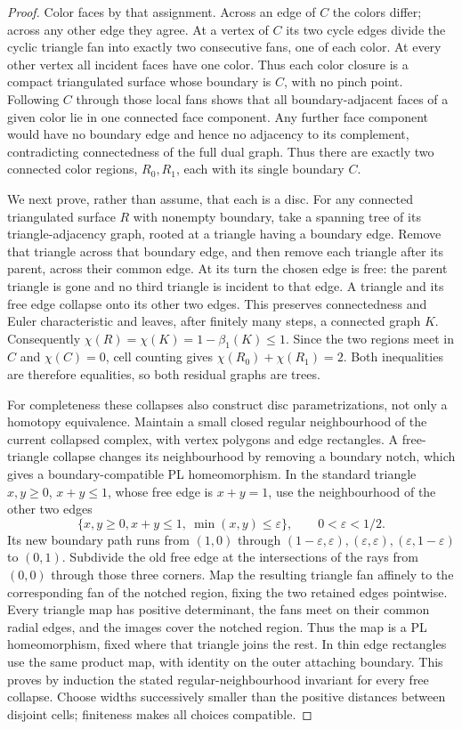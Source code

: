 \begin{proof}
Color faces by that assignment. Across an edge of $C$ the colors differ;
across any other edge they agree. At a vertex of $C$ its two cycle
edges divide the cyclic triangle fan into exactly two consecutive fans,
one of each color. At every other vertex all incident faces have one
color. Thus each color closure is a compact triangulated surface whose
boundary is $C$, with no pinch point. Following $C$ through those local
fans shows that all boundary-adjacent faces of a given color lie in one
connected face component. Any further face component would have no
boundary edge and hence no adjacency to its complement, contradicting
connectedness of the full dual graph. Thus there are exactly two
connected color regions, $R_0,R_1$, each with its single boundary $C$.

We next prove, rather than assume, that each is a disc. For any connected
triangulated surface $R$ with nonempty boundary, take a spanning tree
of its triangle-adjacency graph, rooted at a triangle having a boundary
edge. Remove that triangle across that boundary edge, and then remove
each triangle after its parent, across their common edge. At its turn
the chosen edge is free: the parent triangle is gone and no third
triangle is incident to that edge. A triangle and its free edge collapse
onto its other two edges. This preserves connectedness and Euler
characteristic and leaves, after finitely many steps, a connected graph
$K$. Consequently $\chi(R)=\chi(K)=1-\beta_1(K)\leq1$.
Since the two regions meet in $C$ and $\chi(C)=0$, cell counting gives
$\chi(R_0)+\chi(R_1)=2$. Both inequalities are therefore equalities,
so both residual graphs are trees.

For completeness these collapses also construct disc parametrizations,
not only a homotopy equivalence. Maintain a small closed regular
neighbourhood of the current collapsed complex, with vertex polygons
and edge rectangles. A free-triangle collapse changes its neighbourhood
by removing a boundary notch, which gives a boundary-compatible PL
homeomorphism. In the standard triangle
$x,y\geq0$, $x+y\leq1$, whose free edge is $x+y=1$, use the
neighbourhood of the other two edges
\begin{equation}\label{eq:gauss-triangle-notch}
 \{x,y\geq0, x+y\leq1,\ \min(x,y)\leq\varepsilon\},
 \qquad 0<\varepsilon<1/2.
\end{equation}
Its new boundary path runs from $(1,0)$ through
$(1-\varepsilon,\varepsilon),(\varepsilon,\varepsilon),
(\varepsilon,1-\varepsilon)$ to $(0,1)$.
Subdivide the old free edge at the intersections of the rays from
$(0,0)$ through those three corners. Map the resulting triangle fan
affinely to the corresponding fan of the notched region, fixing the two
retained edges pointwise. Every triangle map has positive determinant,
the fans meet on their common radial edges, and the images cover the
notched region. Thus the map is a PL homeomorphism, fixed where that
triangle joins the rest. In thin edge rectangles use the same product
map, with identity on the outer attaching boundary. This proves by
induction the stated regular-neighbourhood invariant for every free
collapse. Choose widths successively smaller than the positive distances
between disjoint cells; finiteness makes all choices compatible.


\end{proof}
